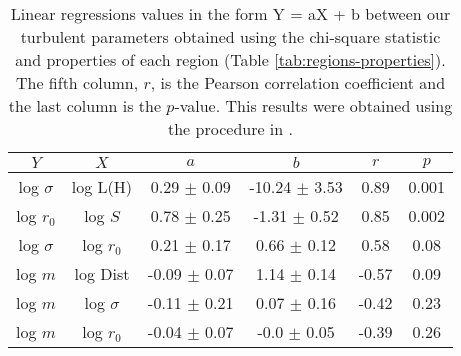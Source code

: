 \begin{table*}
\begin{center}
\caption{Linear regressions values in the form Y = aX + b between our turbulent parameters obtained using the chi-square statistic and properties of each region (Table \ref{tab:regions-properties}). The fifth column, $r$, is the Pearson correlation coefficient and the last column is the $p$-value. This results were obtained using the procedure in \citet{2007ApJ...665.1489K}.}
\begin{tabular}{cccccc}
\hline
            $Y$ &                   $X$ &                 $a$ &                 $b$ &       $r$ &      $p$ \\
\hline
 log $\sigma$ &            log L(H) &   0.29 $\pm$ 0.09 &  -10.24 $\pm$ 3.53 &   0.89 &  0.001 \\
    log $r_0$ &             log $S$ &   0.78 $\pm$ 0.25 &   -1.31 $\pm$ 0.52 &   0.85 &  0.002 \\
 log $\sigma$ &         log $r_{0}$ &   0.21 $\pm$ 0.17 &    0.66 $\pm$ 0.12 &   0.58 &   0.08 \\
      log $m$ &            log Dist &  -0.09 $\pm$ 0.07 &    1.14 $\pm$ 0.14 &  -0.57 &   0.09 \\
      log $m$ &        log $\sigma$ &  -0.11 $\pm$ 0.21 &    0.07 $\pm$ 0.16 &  -0.42 &   0.23 \\
      log $m$ &         log $r_{0}$ &  -0.04 $\pm$ 0.07 &    -0.0 $\pm$ 0.05 &  -0.39 &   0.26 \\
\bottomrule
\end{tabular}\label{tab:RestStats}
\end{center}
\end{table*}


